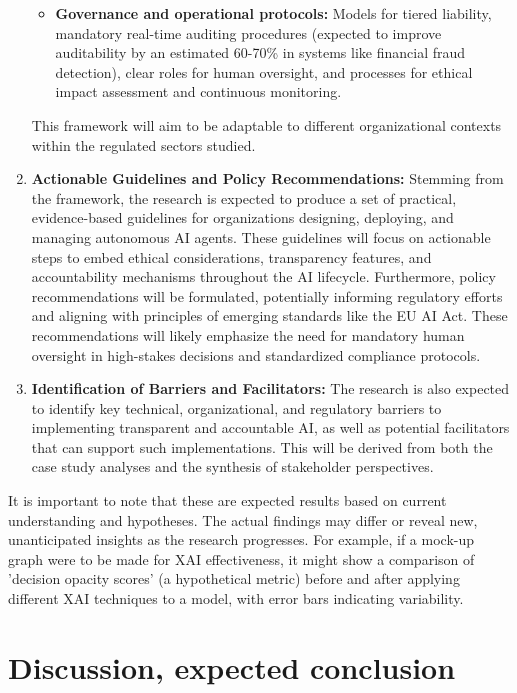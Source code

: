 \documentclass[english]{hogent-article}
\begin{document}
\begin{enumerate}
\begin{itemize}
            \item \textbf{Governance and operational protocols:} Models for tiered liability, mandatory real-time auditing procedures (expected to improve auditability by an estimated 60-70\% in systems like financial fraud detection), clear roles for human oversight, and processes for ethical impact assessment and continuous monitoring.
        \end{itemize}
    This framework will aim to be adaptable to different organizational contexts within the regulated sectors studied.

    \item \textbf{Actionable Guidelines and Policy Recommendations:} Stemming from the framework, the research is expected to produce a set of practical, evidence-based guidelines for organizations designing, deploying, and managing autonomous AI agents. These guidelines will focus on actionable steps to embed ethical considerations, transparency features, and accountability mechanisms \newline
    throughout the AI lifecycle. Furthermore, policy recommendations will be formulated, potentially informing regulatory efforts and aligning with principles of emerging standards like the EU AI Act. These recommendations will likely emphasize the need for mandatory human oversight in high-stakes decisions and standardized compliance protocols.

    \item \textbf{Identification of Barriers and Facilitators:} The research is also expected to identify key technical, organizational, and regulatory barriers to implementing transparent and accountable AI, as well as potential facilitators that can support such implementations. This will be derived from both the case study analyses and the synthesis of stakeholder perspectives.
\end{enumerate}
\newpage
It is important to note that these are expected results based on current understanding and hypotheses. The actual findings may differ or reveal new, unanticipated insights as the research progresses. For example, if a mock-up graph were to be made for XAI effectiveness, it might show a comparison of 'decision opacity scores' (a hypothetical metric) before and after applying different XAI techniques to a model, with error bars indicating variability.


\section{Discussion, expected conclusion}%
\label{sec:discussion-conclusion}
\end{document}
